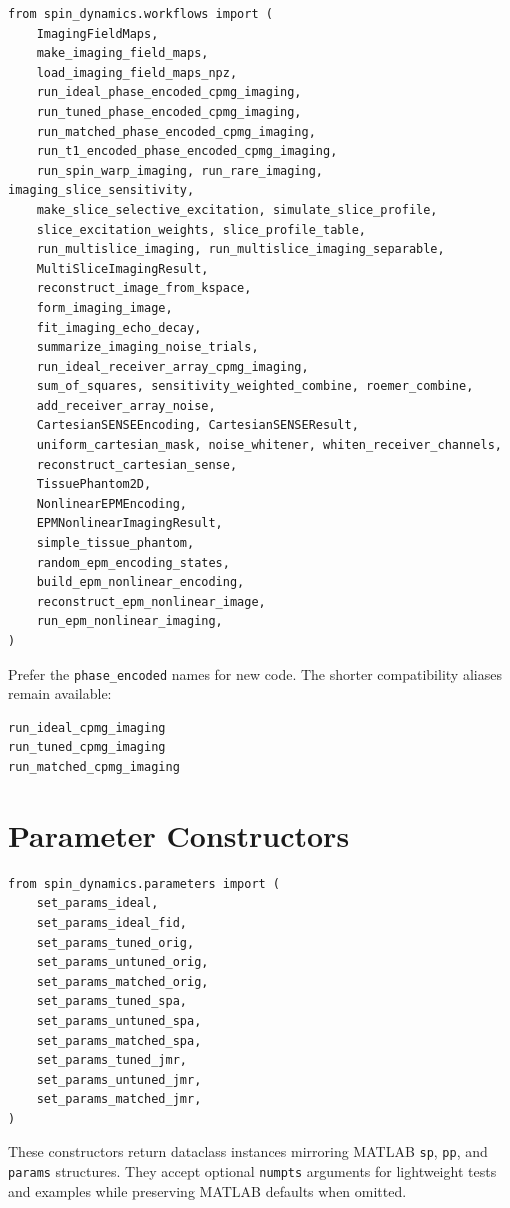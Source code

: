 \documentclass[11pt,oneside]{report}
\newcommand{\code}[1]{\texttt{#1}}
\begin{document}
\begin{lstlisting}
from spin_dynamics.workflows import (
    ImagingFieldMaps,
    make_imaging_field_maps,
    load_imaging_field_maps_npz,
    run_ideal_phase_encoded_cpmg_imaging,
    run_tuned_phase_encoded_cpmg_imaging,
    run_matched_phase_encoded_cpmg_imaging,
    run_t1_encoded_phase_encoded_cpmg_imaging,
    run_spin_warp_imaging, run_rare_imaging, imaging_slice_sensitivity,
    make_slice_selective_excitation, simulate_slice_profile,
    slice_excitation_weights, slice_profile_table,
    run_multislice_imaging, run_multislice_imaging_separable,
    MultiSliceImagingResult,
    reconstruct_image_from_kspace,
    form_imaging_image,
    fit_imaging_echo_decay,
    summarize_imaging_noise_trials,
    run_ideal_receiver_array_cpmg_imaging,
    sum_of_squares, sensitivity_weighted_combine, roemer_combine,
    add_receiver_array_noise,
    CartesianSENSEEncoding, CartesianSENSEResult,
    uniform_cartesian_mask, noise_whitener, whiten_receiver_channels,
    reconstruct_cartesian_sense,
    TissuePhantom2D,
    NonlinearEPMEncoding,
    EPMNonlinearImagingResult,
    simple_tissue_phantom,
    random_epm_encoding_states,
    build_epm_nonlinear_encoding,
    reconstruct_epm_nonlinear_image,
    run_epm_nonlinear_imaging,
)
\end{lstlisting}

Prefer the \code{phase\_encoded} names for new code. The shorter compatibility
aliases remain available:

\begin{lstlisting}
run_ideal_cpmg_imaging
run_tuned_cpmg_imaging
run_matched_cpmg_imaging
\end{lstlisting}

\section{Parameter Constructors}

\begin{lstlisting}
from spin_dynamics.parameters import (
    set_params_ideal,
    set_params_ideal_fid,
    set_params_tuned_orig,
    set_params_untuned_orig,
    set_params_matched_orig,
    set_params_tuned_spa,
    set_params_untuned_spa,
    set_params_matched_spa,
    set_params_tuned_jmr,
    set_params_untuned_jmr,
    set_params_matched_jmr,
)
\end{lstlisting}

These constructors return dataclass instances mirroring MATLAB \code{sp},
\code{pp}, and \code{params} structures. They accept optional \code{numpts}
arguments for lightweight tests and examples while preserving MATLAB defaults
when omitted.
\end{document}
